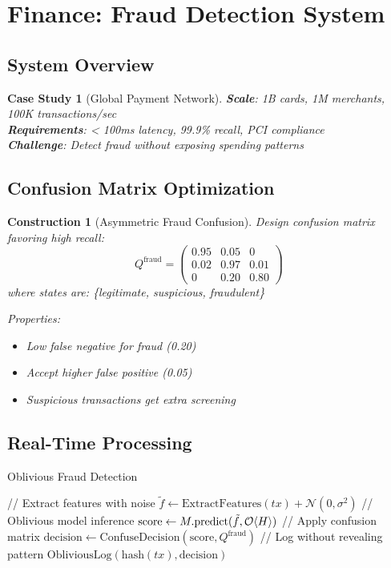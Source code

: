 \documentclass[11pt,final]{article}
\newcommand{\observed}[1]{\tilde{#1}}
\newtheorem{construction}[theorem]{Construction}
\newtheorem{casestudy}[theorem]{Case Study}
\begin{document}
\section{Finance: Fraud Detection System}

\subsection{System Overview}

\begin{casestudy}[Global Payment Network]
\textbf{Scale}: 1B cards, 1M merchants, 100K transactions/sec\\
\textbf{Requirements}: < 100ms latency, 99.9\% recall, PCI compliance\\
\textbf{Challenge}: Detect fraud without exposing spending patterns
\end{casestudy}

\subsection{Confusion Matrix Optimization}

\begin{construction}[Asymmetric Fraud Confusion]
Design confusion matrix favoring high recall:
\begin{equation}
Q^{\text{fraud}} = \begin{pmatrix}
0.95 & 0.05 & 0 \\
0.02 & 0.97 & 0.01 \\
0 & 0.20 & 0.80
\end{pmatrix}
\end{equation}
where states are: \{legitimate, suspicious, fraudulent\}

Properties:
\begin{itemize}
    \item Low false negative for fraud (0.20)
    \item Accept higher false positive (0.05)
    \item Suspicious transactions get extra screening
\end{itemize}
\end{construction}

\subsection{Real-Time Processing}

\begin{algorithm}[H]
\caption{Oblivious Fraud Detection}
// Extract features with noise\;
$\observed{f} \gets \text{ExtractFeatures}(tx) + \mathcal{N}(0, \sigma^2)$\;
// Oblivious model inference\;
$\text{score} \gets M.\text{predict}(\observed{f}, \Obv{H})$\;
// Apply confusion matrix\;
$\text{decision} \gets \text{ConfuseDecision}(\text{score}, Q^{\text{fraud}})$\;
// Log without revealing pattern\;
$\text{ObliviousLog}(\text{hash}(tx), \text{decision})$\;
\end{algorithm}
\end{document}
